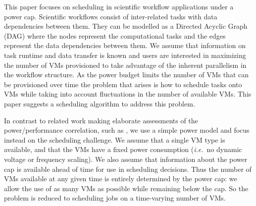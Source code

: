\documentclass[10pt, conference, compsocconf]{IEEEtran} %
\newcommand{\ie}{\textit{i.e.}\ }
\begin{document}

This paper focuses on scheduling in scientific workflow applications under a power cap.
Scientific workflows \cite{deelmanbook} consist of inter-related tasks with data dependencies between them.
They can be modelled as a Directed Acyclic Graph (DAG) where the nodes represent the computational tasks and the edges represent the data dependencies between them.
We assume that information on task runtime and data transfer is known and users are interested in maximizing the number of VMs provisioned to take advantage of the inherent parallelism in the workflow structure.
As the power budget limits the number of VMs that can be provisioned over time the problem that arises is how to schedule tasks onto VMs while taking into account fluctuations in the number of available VMs.
This paper suggests a scheduling algorithm to address this problem.

In contrast to related work making elaborate assessments of the power/performance correlation, such as \cite{bailey2014adaptive}, we use a simple power model and focus instead on the scheduling challenge.
We assume that a single VM type is available, and that the VMs have a fixed power consumption (\ie no dynamic voltage or frequency scaling).
We also assume that information about the power cap is available ahead of time for use in scheduling decisions.
Thus the number of VMs available at any given time is entirely determined by the power cap: we allow the use of as many VMs as possible while remaining below the cap.
So the problem is reduced to scheduling jobs on a time-varying number of VMs.
\end{document}
